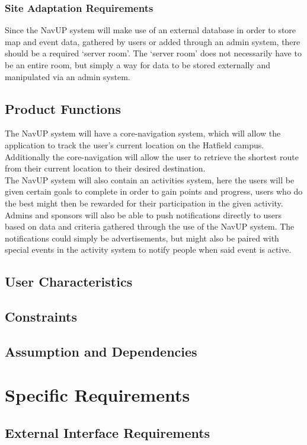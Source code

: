 \documentclass[a4paper,12pt]{article}
\begin{document}
\subsubsection{Site Adaptation Requirements}
Since the NavUP system will make use of an external database in order to store map and event data, gathered by users or added through an admin system, there should be a required ‘server room’. The ‘server room’ does not necessarily have to be an entire room, but simply a way for data to be stored externally and manipulated via an admin system.
\subsection{Product Functions}
The NavUP system will have a core-navigation system, which will allow the application to track the user’s current location on the Hatfield campus. Additionally the core-navigation will allow the user to retrieve the shortest route from their current location to their desired destination.\\
The NavUP system will also contain an activities system, here the users will be given certain goals to complete in order to gain points and progress, users who do the best might then be rewarded for their participation in the given activity.\\
Admins and sponsors will also be able to push notifications directly to users based on data and criteria gathered through the use of the NavUP system. The notifications could simply be advertisements, but might also be paired with special events in the activity system to notify people when said event is active.
\subsection{User Characteristics}
\subsection{Constraints}
\subsection{Assumption and Dependencies}

\section{Specific Requirements}
\subsection{External Interface Requirements}
\end{document}
